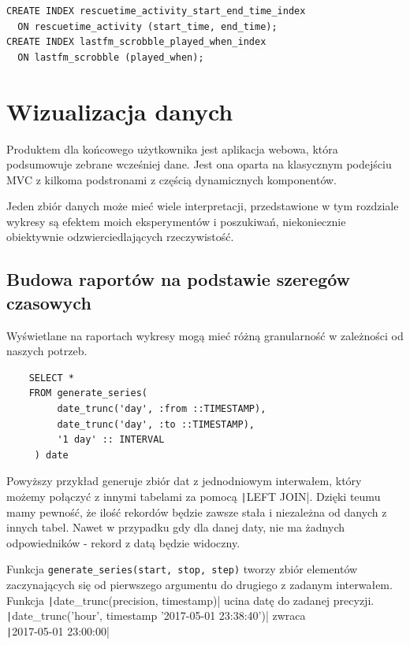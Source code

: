 \documentclass[openright]{xmgr}
\begin{document}
\begin{verbatim}
CREATE INDEX rescuetime_activity_start_end_time_index
  ON rescuetime_activity (start_time, end_time);
CREATE INDEX lastfm_scrobble_played_when_index
  ON lastfm_scrobble (played_when);
\end{verbatim}

\chapter{Wizualizacja danych}

    Produktem dla końcowego użytkownika jest aplikacja webowa, która podsumowuje zebrane wcześniej dane.
    Jest ona oparta na klasycznym podejściu MVC z kilkoma podstronami z częścią dynamicznych komponentów.

    Jeden zbiór danych może mieć wiele interpretacji, przedstawione w tym rozdziale wykresy
    są efektem moich eksperymentów i poszukiwań, niekoniecznie obiektywnie odzwierciedlających rzeczywistość.

    \section{Budowa raportów na podstawie szeregów czasowych}

    Wyświetlane na raportach wykresy mogą mieć różną granularność w zależności od naszych potrzeb.

    \begin{verbatim}
    SELECT *
    FROM generate_series(
         date_trunc('day', :from ::TIMESTAMP),
         date_trunc('day', :to ::TIMESTAMP),
         '1 day' :: INTERVAL
     ) date
    \end{verbatim}

    Powyższy przykład generuje zbiór dat z jednodniowym interwałem,
    który możemy połączyć z innymi tabelami za pomocą \texttt|LEFT JOIN|.
    Dzięki teumu mamy pewność, że ilość rekordów będzie zawsze stała i niezależna od danych z innych tabel.
    Nawet w przypadku gdy dla danej daty, nie ma żadnych odpowiedników - rekord z datą będzie widoczny.

    Funkcja \texttt{generate_series(start, stop, step)} tworzy zbiór elementów
    zaczynających się od pierwszego argumentu do drugiego z zadanym interwałem.
    Funkcja \texttt|date_trunc(precision, timestamp)| ucina datę do zadanej precyzji.
    \texttt|date_trunc('hour', timestamp '2017-05-01 23:38:40')| zwraca \\ \texttt|2017-05-01 23:00:00|
\end{document}

